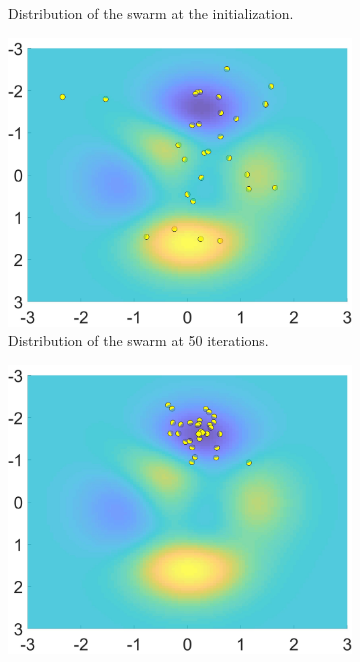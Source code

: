 \begin{figure}[hbp]
\begin{subfigure}[b]{0.5\textwidth}
    \caption{Distribution of the swarm at the initialization.}
    \label{fig:f2}
  \end{subfigure}
  \begin{subfigure}[b]{0.5\textwidth}
    \includegraphics[width=\textwidth, height=\textwidth]{"Part 2 - Search-Based Optimization/Particle Swarm Optimization/Images/FIG3.1.jpg"}
    \caption{Distribution of the swarm at 50 iterations.}
    \label{fig:f3}
  \end{subfigure}
  \begin{subfigure}[b]{0.5\textwidth}
    \includegraphics[width=\textwidth, height=\textwidth]{"Part 2 - Search-Based Optimization/Particle Swarm Optimization/Images/FIG4.1.jpg"}

\end{subfigure}
\end{figure}
